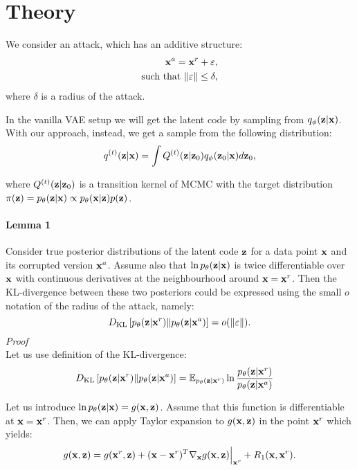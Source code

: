 
\onecolumn
\section{Theory}\label{appendix:theory}
We consider an attack, which has an additive structure:
\begin{align}
    {\mathbf{x}}^a = {\mathbf{x}}^r + \varepsilon, \\
    \text{such that }\|\varepsilon\| \leq \delta,
\end{align}
where $\delta$ is a radius of the attack. 

In the vanilla VAE setup we will get the latent code by sampling from $q_{\phi}({\mathbf{z}}|{\mathbf{x}})$. With our approach, instead, we get a sample from the following distribution:
\begin{align}
    q^{(t)}({\mathbf{z}}|{\mathbf{x}}) = \int Q^{(t)}({\mathbf{z}}|{\mathbf{z}}_0) q_{\phi}({\mathbf{z}}_0|{\mathbf{x}}) d{\mathbf{z}}_0,
\end{align}

where $Q^{(t)}({\mathbf{z}}|{\mathbf{z}}_0)$ is a transition kernel of MCMC with the target distribution $\pi({\mathbf{z}}) = p_{\theta}({\mathbf{z}}|{\mathbf{x}}) \propto p_{\theta}({\mathbf{x}}|{\mathbf{z}})p({\mathbf{z}})$.


\paragraph{Lemma 1}
Consider true posterior distributions of the latent code ${\mathbf{z}}$ for a data point ${\mathbf{x}}$ and its corrupted version ${\mathbf{x}}^a$.  Assume also that $\ln p_{\theta}({\mathbf{z}}|{\mathbf{x}})$ is twice differentiable over ${\mathbf{x}}$ with continuous derivatives at the neighbourhood around ${\mathbf{x}}={\mathbf{x}}^r$. 
Then the KL-divergence between these two posteriors could be expressed using the small $o$ notation of the radius of the attack, namely:
\begin{equation}
     D_{\mathrm{KL}}\left[p_{\theta}({\mathbf{z}}|{\mathbf{x}}^r)\|p_{\theta}({\mathbf{z}}|{\mathbf{x}}^a)\right] = o(\|\varepsilon\|).
\end{equation}
\textit{Proof}\\
Let us use definition of the KL-divergence:
\begin{align} \label{eq:kl_def}
     \KL{p_{\theta}(\rvz|\rvx^r)}{p_{\theta}(\rvz|\rvx^a)} &= \E_{p_{\theta}(\rvz|\rvx^r)} \ln \frac{p_{\theta}(\rvz|\rvx^r)}{p_{\theta}(\rvz|\rvx^a)}  %
\end{align}

Let us introduce $\ln p_{\theta}({\mathbf{z}}|{\mathbf{x}}) = g({\mathbf{x}}, {\mathbf{z}})$. Assume that this function is differentiable at ${\mathbf{x}} = {\mathbf{x}}^r$. Then, we can apply Taylor expansion to $g({\mathbf{x}}, {\mathbf{z}})$ in the point ${\mathbf{x}}^r$ which yields:
\begin{equation}
    g({\mathbf{x}}, {\mathbf{z}}) =  g({\mathbf{x}}^r, {\mathbf{z}}) + ({\mathbf{x}} - {\mathbf{x}}^r)^T \nabla_{{\mathbf{x}}} g({\mathbf{x}}, {\mathbf{z}}) \Big|_{{\mathbf{x}}^r} + R_1({\mathbf{x}}, {\mathbf{x}}^r) .
\end{equation}

